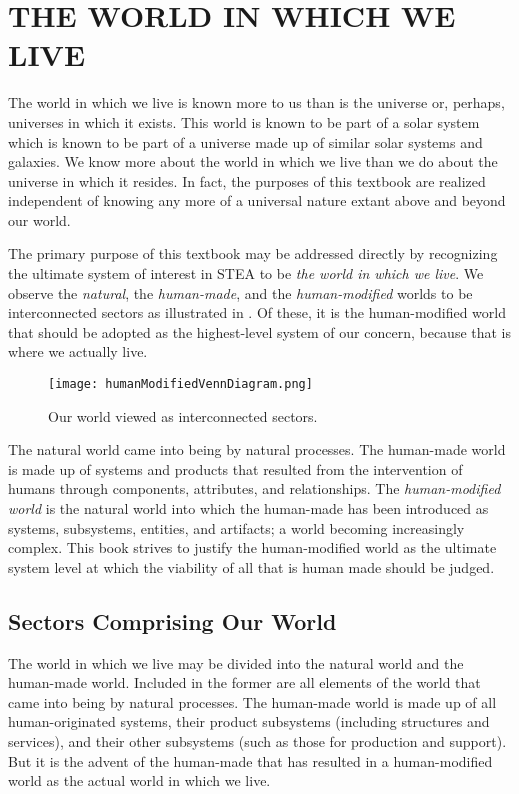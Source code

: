 \chapter{THE WORLD IN WHICH WE LIVE} \label{chap:1}

The world in which we live is known more to us than is the universe or, perhaps, universes in which it exists.  This world is known to be part of a solar system which is known to be part of a universe made up of similar solar systems and galaxies.  We know more about the world in which we live than we do about the universe in which it resides.  In fact, the purposes of this textbook are realized independent of knowing any more of a universal nature extant above and beyond our world.

The primary purpose of this textbook may be addressed directly by recognizing the ultimate system of interest in STEA to be \textit{the world in which we live}.  We observe the \textit{natural}, the \textit{human-made}, and the \textit{human-modified} worlds to be interconnected sectors as illustrated in .  Of these, it is the human-modified world that should be adopted as the highest-level system of our concern, because that is where we actually live.

\begin{figure}[h]
\centering
\texttt{[image: humanModifiedVennDiagram.png]}
\caption{Our world viewed as interconnected sectors.}
\label{fig:humanModifiedVennDiagram}
\end{figure}
    
The natural world came into being by natural processes.  The human-made world is made up of systems and products that resulted from the intervention of humans through components, attributes, and relationships.  The \textit{human-modified world} is the natural world into which the human-made has been introduced as systems, subsystems, entities, and artifacts; a world becoming increasingly complex.  This book strives to justify the human-modified world as the ultimate system level at which the viability of all that is human made should be judged.

\section{Sectors Comprising Our World}\label{sec:sectorsComprisingWorld}

The world in which we live may be divided into the natural world and the human-made world.  Included in the former are all elements of the world that came into being by natural processes. The human-made world is made up of all human-originated systems, their product subsystems (including structures and services), and their other subsystems (such as those for production and support).  But it is the advent of the human-made that has resulted in a human-modified world as the actual world in which we live.

